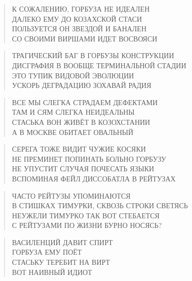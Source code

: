 \poemtitle{***}
\begin{verse}
К СОЖАЛЕНИЮ, ГОРБУЗА НЕ ИДЕАЛЕН\\
ДАЛЕКО ЕМУ ДО КОЗАХСКОЙ СТАСИ\\
ПОЛЬЗУЕТСЯ ОН ЗВЕЗДОЙ И БАНАЛЕН\\
СО СВОИМИ ВИРШАМИ ИДЕТ ВОСВОЯСИ
\end{verse}

\poemtitle{***}
\begin{verse}
ТРАГИЧЕСКИЙ БАГ В ГОРБУЗЫ КОНСТРУКЦИИ\\
ДИСГРАФИЯ В ВООБЩЕ ТЕРМИНАЛЬНОЙ СТАДИИ\\
ЭТО ТУПИК ВИДОВОЙ ЭВОЛЮЦИИ\\
УСКОРЬ ДЕГРАДАЦИЮ ЗОХАВАЙ РАДИЯ
\end{verse}

\poemtitle{***}
\begin{verse}
ВСЕ МЫ СЛЕГКА СТРАДАЕМ ДЕФЕКТАМИ\\
ТАМ И СЯМ СЛЕГКА НЕИДЕАЛЬНЫ\\
СТАСЬКА ВОН ЖИВЁТ В КОЗОХСТАНИИ\\
А В МОСКВЕ ОБИТАЕТ ОВАЛЬНЫЙ
\end{verse}

\poemtitle{***}
\begin{verse}
СЕРЕГА ТОЖЕ ВИДИТ ЧУЖИЕ КОСЯКИ\\
НЕ ПРЕМИНЕТ ПОПИНАТЬ БОЛЬНО ГОРБУЗУ\\
НЕ УПУСТИТ СЛУЧАЯ ПОЧЕСАТЬ ЯЗЫКИ\\
ВСПОМИНАЯ ФЕЙЛ ДИССОБАТЛА В РЕЙТУЗАХ
\end{verse}

\poemtitle{***}
\begin{verse}
ЧАСТО РЕЙТУЗЫ УПОМИНАЮТСЯ\\
В СТИШКАХ ТИМУРКИ, СКВОЗЬ СТРОКИ СВЕТЯСЬ\\
НЕУЖЕЛИ ТИМУРКО ТАК ВОТ СТЕБАЕТСЯ\\
С РЕЙТУЗАМИ ПО ЖИЗНИ БУРНО НОСЯСЬ?
\end{verse}

\poemtitle{***}
\begin{verse}
ВАСИЛЕНЦИЙ ДАВИТ СПИРТ\\
ГОРБУЗА ЕМУ ПОЁТ\\
СТАСЬКУ ТЕРЕБИТ НА ВИРТ\\
ВОТ НАИВНЫЙ ИДИОТ
\end{verse}

